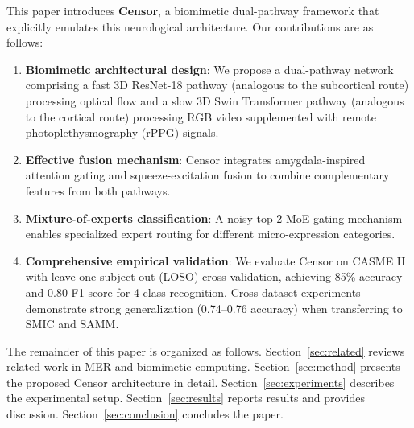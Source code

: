 This paper introduces \textbf{Censor}, a biomimetic dual-pathway framework that explicitly emulates this neurological architecture. Our contributions are as follows:

\begin{enumerate}
\item \textbf{Biomimetic architectural design}: We propose a dual-pathway network comprising a fast 3D ResNet-18 pathway (analogous to the subcortical route) processing optical flow and a slow 3D Swin Transformer pathway (analogous to the cortical route) processing RGB video supplemented with remote photoplethysmography (rPPG) signals.

\item \textbf{Effective fusion mechanism}: Censor integrates amygdala-inspired attention gating and squeeze-excitation fusion to combine complementary features from both pathways.

\item \textbf{Mixture-of-experts classification}: A noisy top-2 MoE gating mechanism enables specialized expert routing for different micro-expression categories.

\item \textbf{Comprehensive empirical validation}: We evaluate Censor on CASME II with leave-one-subject-out (LOSO) cross-validation, achieving 85\% accuracy and 0.80 F1-score for 4-class recognition. Cross-dataset experiments demonstrate strong generalization (0.74--0.76 accuracy) when transferring to SMIC and SAMM.
\end{enumerate}

The remainder of this paper is organized as follows. Section~\ref{sec:related} reviews related work in MER and biomimetic computing. Section~\ref{sec:method} presents the proposed Censor architecture in detail. Section~\ref{sec:experiments} describes the experimental setup. Section~\ref{sec:results} reports results and provides discussion. Section~\ref{sec:conclusion} concludes the paper.